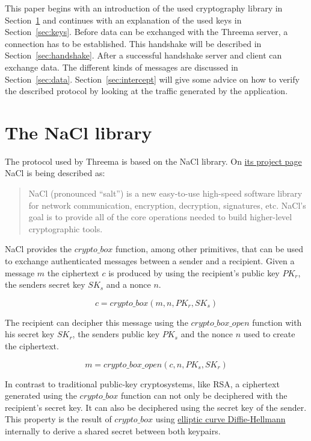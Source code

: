 \documentclass[11pt,a4paper,bookmarksopen=true]{article}
\begin{document}
This paper begins with an introduction of the used cryptography
library in Section~\ref{sec:nacl} and continues with an explanation of
the used keys in Section~\ref{sec:keys}. Before data can be
exchanged with the Threema server, a connection has to be
established. This handshake will be described in
Section~\ref{sec:handshake}.
After a successful handshake server and
client can exchange data. The different kinds of messages are
discussed in Section~\ref{sec:data}.
Section~\ref{sec:intercept} will give
some advice on how to verify the described protocol by
looking at the traffic generated by the application.

\section{The NaCl library}\label{sec:nacl}
The protocol used by Threema is based on the NaCl library. On
\href{http://nacl.cr.yp.to/}{its project page} NaCl is being described
as:

\begin{quote}
  NaCl (pronounced ``salt'') is a new easy-to-use high-speed software library for network communication, encryption, decryption, signatures, etc. NaCl's goal is to provide all of the core operations needed to build higher-level cryptographic tools.
\end{quote}

NaCl provides the
$\mathit{crypto\_box}$ function, among other primitives, that can be used to exchange
authenticated messages between a sender and a recipient. Given a
message $m$ the ciphertext $c$ is produced by using the recipient's
public key $PK_r$, the senders secret key $SK_s$ and a
nonce $n$.

\begin{equation}
 c = \mathit{crypto\_box}(m, n, \mathit{PK}_r, \mathit{SK}_s)
\end{equation}

The recipient can decipher this message using the
$\mathit{crypto\_box\_open}$ function with his secret key $\mathit{SK}_r$,
the senders public key $\mathit{PK}_s$ and the nonce $n$ used to create the ciphertext.

\begin{equation}
m = \mathit{crypto\_box\_open}(c, n, \mathit{PK}_s, \mathit{SK}_r)
\end{equation}

In contrast to traditional public-key cryptosystems, like RSA, a
ciphertext generated using the $\mathit{crypto\_box}$ function can not
only be deciphered with the recipient's secret key. It can also be
deciphered using the secret key of the sender.  This property is the
result of $\mathit{crypto\_box}$ using \href{https://en.wikipedia.org/wiki/ECDH}{elliptic
  curve Diffie-Hellmann} internally to derive a shared secret between both keypairs.
\end{document}
